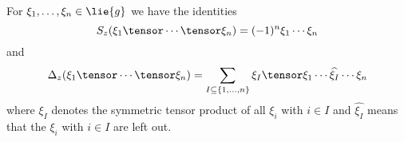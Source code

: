 \begin{lemma}
    \label{Thm:Hopf:Formulas}%
    For $\xi_1, \ldots, \xi_n \in \lie{g}$ we have the identities
    \begin{equation}
        \label{Hopf:AntipodeFormula}
        S_z(\xi_1 \tensor \cdots \tensor \xi_n)
        =
        (-1)^n
        \xi_1 \cdots \xi_n
    \end{equation}
    and
    \begin{equation}
        \label{Hopf:CoproductFormula}
        \ocoproduct_z(\xi_1 \tensor \cdots \tensor \xi_n)
        =
        \sum\limits_{
        	I \subseteq
        	\{1, \ldots, n\}
        }
        \xi_I
        \tensor
        \xi_1 \cdots
        \widehat{\xi_I}
        \cdots \xi_n
    \end{equation}
    where $\xi_I$ denotes the symmetric tensor product of all $\xi_i$ with 
    $i \in I$ and $\widehat{\xi_I}$ means that the $\xi_i$ with $i \in I$ 
    are left out.
\end{lemma}
